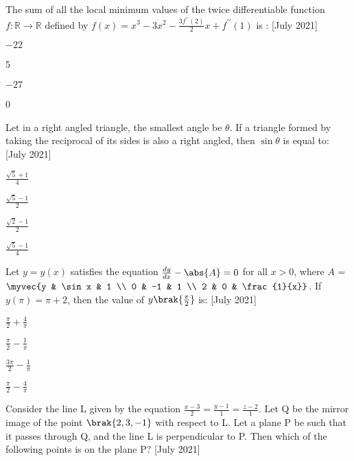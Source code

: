     \item The sum of all the local minimum values of the twice differentiable function $f : \mathbb{R}\to
 \mathbb{R}$ defined by  $f(x) = x^3 - 3x^2 - \frac{3f^{\prime \prime}(2)}{2}x + f^{\prime\prime}(1)$ is : \hfill[July 2021]
 \begin{enumerate}
 \begin{multicols}{2}
     \item $-22$
     \item 5
     \item $-27$
     \item 0
 \end{multicols}
 \end{enumerate}
  \item Let in a right angled triangle, the smallest angle be $\theta$. If a triangle formed by taking the reciprocal of its sides is also a right angled, then $\sin \theta$ is equal to: \hfill[July 2021]
 \begin{enumerate}
  \begin{multicols}{4}
      \item $\frac{\sqrt{5}+1}{4}$
      \item $\frac{\sqrt{5}-1}{2}$
      \item $\frac{\sqrt{2}-1}{2}$
      \item $\frac{\sqrt{5}-1}{4}$
  \end{multicols}
 \end{enumerate}
  \item Let $y = y(x)$ satisfies the equation $\frac{dy}{dx} - \abs{A} = 0$ for all $x > 0$, where $A$ = $\myvec{y & \sin x & 1 \\ 0 & -1 & 1 \\ 2 & 0 & \frac{1}{x}}$. If $y(\pi) = \pi + 2$, then the value of $y\brak{\frac{\pi}{2}}$ is: \hfill[July 2021]
 \begin{enumerate}
 \begin{multicols}{4}
     \item $\frac{\pi}{2} + \frac{4}{\pi}$
     \item $\frac{\pi}{2} - \frac{1}{\pi} $
     \item $\frac{3\pi}{2} - \frac{1}{\pi}$
     \item $\frac{\pi}{2} - \frac{4}{\pi} $
 \end{multicols}
 \end{enumerate}
  \item Consider the line L given by the equation $\frac{x-3}{2} = \frac{y-1}{1} = \frac{z-2}{1}$. Let Q be the mirror image of the point $\brak{2,3,-1}$ with respect to L. Let a plane P be such that it passes through Q, and the line L is perpendicular to P. Then which of the following points is on the plane P? \hfill[July 2021]
